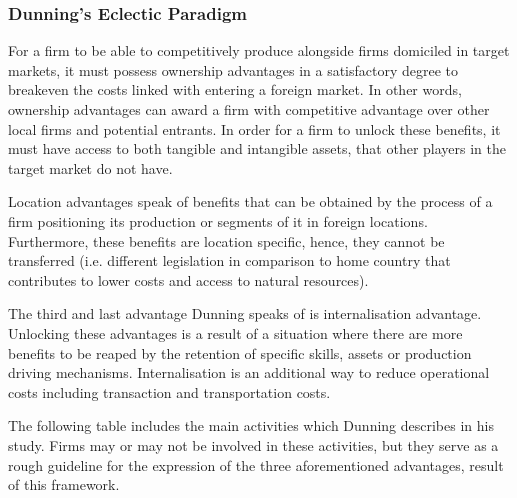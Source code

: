 \documentclass[11pt,a4paper]{article}
\begin{document}
{{\vspace{-2mm}
\subsubsection{Dunning's Eclectic Paradigm}
\vspace{-2mm}
 \par
For a firm to be able to competitively produce alongside firms domiciled in target markets, it must possess ownership advantages in a satisfactory degree to breakeven the costs linked with entering a foreign market. In other words, ownership advantages can award a firm with competitive advantage over other local firms and potential entrants. In order for a firm to unlock these benefits, it must have access to both tangible and intangible assets, that other players in the target market do not have.  \par
Location advantages speak of benefits that can be obtained by the process of a firm positioning its production or segments of it in foreign locations. Furthermore, these benefits are location specific, hence, they cannot be transferred (i.e. different legislation in comparison to home country that contributes to lower costs and access to natural resources). \par
The third and last advantage Dunning speaks of is internalisation advantage. Unlocking these advantages is a result of a situation where there are more benefits to be reaped by the retention of specific skills, assets or production driving mechanisms. Internalisation is an additional way to reduce operational costs including transaction and transportation costs. \par
The following table includes the main activities which Dunning describes in his study. Firms may or may not be involved in these activities, but they serve as a rough guideline for the expression of the three aforementioned advantages, result of this framework. 

}}
\end{document}
